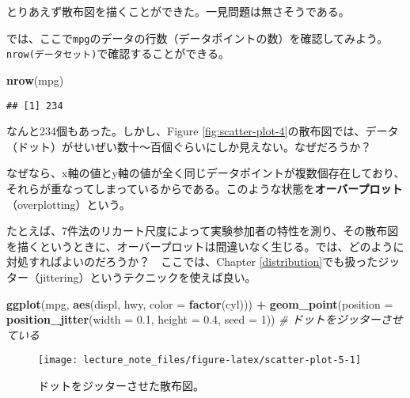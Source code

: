 \documentclass[]{book}
\newenvironment{Shaded}{\begin{snugshade}}{\end{snugshade}}
\newcommand{\KeywordTok}[1]{\textcolor[rgb]{0.13,0.29,0.53}{\textbf{#1}}}
\newcommand{\DataTypeTok}[1]{\textcolor[rgb]{0.13,0.29,0.53}{#1}}
\newcommand{\DecValTok}[1]{\textcolor[rgb]{0.00,0.00,0.81}{#1}}
\newcommand{\FloatTok}[1]{\textcolor[rgb]{0.00,0.00,0.81}{#1}}
\newcommand{\StringTok}[1]{\textcolor[rgb]{0.31,0.60,0.02}{#1}}
\newcommand{\CommentTok}[1]{\textcolor[rgb]{0.56,0.35,0.01}{\textit{#1}}}
\newcommand{\OperatorTok}[1]{\textcolor[rgb]{0.81,0.36,0.00}{\textbf{#1}}}
\newcommand{\NormalTok}[1]{#1}
\begin{document}
とりあえず散布図を描くことができた。一見問題は無さそうである。

では、ここで\texttt{mpg}のデータの行数（データポイントの数）を確認してみよう。\texttt{nrow(データセット)}で確認することができる。

\begin{Shaded}
\begin{Highlighting}[]
\KeywordTok{nrow}\NormalTok{(mpg)}
\end{Highlighting}
\end{Shaded}

\begin{verbatim}
## [1] 234
\end{verbatim}

なんと234個もあった。しかし、Figure
\ref{fig:scatter-plot-4}の散布図では、データ（ドット）がせいぜい数十〜百個ぐらいにしか見えない。なぜだろうか？

なぜなら、x軸の値とy軸の値が全く同じデータポイントが複数個存在しており、それらが重なってしまっているからである。このような状態を\textbf{オーバープロット}（overplotting）という。

たとえば、7件法のリカート尺度によって実験参加者の特性を測り、その散布図を描くというときに、オーバープロットは間違いなく生じる。では、どのように対処すればよいのだろうか？　ここでは、Chapter
\ref{distribution}でも扱ったジッター（jittering）というテクニックを使えば良い。



\begin{Shaded}
\begin{Highlighting}[]
\KeywordTok{ggplot}\NormalTok{(mpg, }\KeywordTok{aes}\NormalTok{(displ, hwy, }\DataTypeTok{color =} \KeywordTok{factor}\NormalTok{(cyl))) }\OperatorTok{+}
\StringTok{  }\KeywordTok{geom_point}\NormalTok{(}\DataTypeTok{position =} \KeywordTok{position_jitter}\NormalTok{(}\DataTypeTok{width =} \FloatTok{0.1}\NormalTok{, }\DataTypeTok{height =} \FloatTok{0.4}\NormalTok{, }\DataTypeTok{seed =} \DecValTok{1}\NormalTok{)) }\CommentTok{# ドットをジッターさせている}
\end{Highlighting}
\end{Shaded}

\begin{figure}

{\centering \texttt{[image: lecture\_note\_files/figure-latex/scatter-plot-5-1]} 

}

\caption{ドットをジッターさせた散布図。}\label{fig:scatter-plot-5}
\end{figure}
\end{document}
